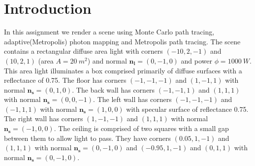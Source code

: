 \section*{Introduction}
In this assignment we render a scene using Monte Carlo path tracing, adaptive(Metropolis) photon mapping and Metropolis path tracing. The scene contains a rectangular diffuse area light with corners $(-10,2,-1)$ and $(10,2,1)$ (area $A=20\ m^2$) and normal $\mathbf{n_l}=(0,-1,0)$ and power $\phi=1000\ W$. This area light illuminates a box comprised primarily of diffuse surfaces with a reflectance of 0.75. The floor has corners $(-1,-1,-1)$ and $(1,-1,1)$ with normal $\mathbf{n_s}=(0,1,0)$. The back wall has corners $(-1,-1,1)$ and $(1,1,1)$ with normal $\mathbf{n_s}=(0,0,-1)$. The left wall has corners $(-1,-1,-1)$ and $(-1,1,1)$ with normal $\mathbf{n_s}=(1,0,0)$ with specular surface of reflectance 0.75. The right wall has corners $(1,-1,-1)$ and $(1,1,1)$ with normal $\mathbf{n_s}=(-1,0,0)$. The ceiling is comprised of two squares with a small gap between them to allow light to pass. They have corners $(0.05,1,-1)$ and $(1,1,1)$ with normal $\mathbf{n_s}=(0,-1,0)$ and $(-0.95,1,-1)$ and $(0,1,1)$ with normal $\mathbf{n_s}=(0,-1,0)$. 
